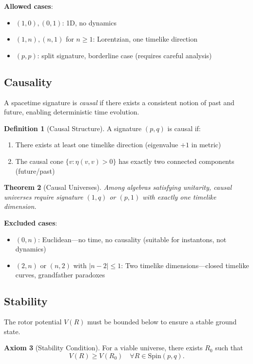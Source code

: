 \documentclass[11pt,a4paper]{article}
\numberwithin{equation}{section}
\theoremstyle{plain}
\newtheorem{theorem}{Theorem}[section]
\theoremstyle{definition}
\newtheorem{definition}[theorem]{Definition}
\newtheorem{axiom}[theorem]{Axiom}
\theoremstyle{remark}
\newcommand{\Spin}{\mathrm{Spin}}
\begin{document}
\textbf{Allowed cases}:
\begin{itemize}
\item $(1,0), (0,1)$: 1D, no dynamics
\item $(1,n), (n,1)$ for $n \geq 1$: Lorentzian, one timelike direction
\item $(p,p)$: split signature, borderline case (requires careful analysis)
\end{itemize}

\subsection{Causality}

A spacetime signature is \emph{causal} if there exists a consistent notion of past and future, enabling deterministic time evolution.

\begin{definition}[Causal Structure]
A signature $(p,q)$ is causal if:
\begin{enumerate}
\item There exists at least one timelike direction (eigenvalue $+1$ in metric)
\item The causal cone $\{v : \eta(v,v) > 0\}$ has exactly two connected components (future/past)
\end{enumerate}
\end{definition}

\begin{theorem}[Causal Universes]
Among algebras satisfying unitarity, causal universes require signature $(1,q)$ or $(p,1)$ with exactly one timelike dimension.
\end{theorem}

\textbf{Excluded cases}:
\begin{itemize}
\item $(0,n)$: Euclidean—no time, no causality (suitable for instantons, not dynamics)
\item $(2,n)$ or $(n,2)$ with $|n-2| \leq 1$: Two timelike dimensions—closed timelike curves, grandfather paradoxes
\end{itemize}

\subsection{Stability}

The rotor potential $V(R)$ must be bounded below to ensure a stable ground state.

\begin{axiom}[Stability Condition]
For a viable universe, there exists $R_0$ such that
\begin{equation}
V(R) \geq V(R_0) \quad \forall R \in \Spin(p,q).
\end{equation}
\end{axiom}
\end{document}
